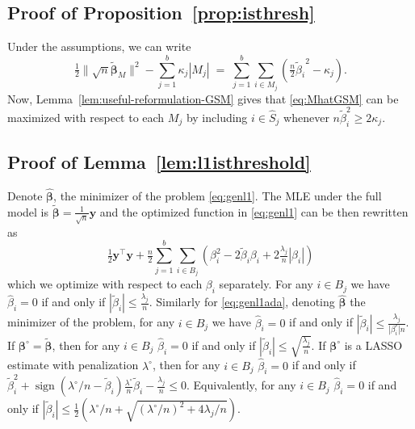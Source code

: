 \documentclass[aos]{imsart}
\theoremstyle{plain}
\newcommand{\bs}{\boldsymbol}
\begin{document}
\begin{supplement}
\subsection{Proof of Proposition~\ref{prop:isthresh}}
	Under the assumptions, we can write 
	$$
	\tfrac{1}{2}\|\sqrt{n}\tilde{\bs \beta}_M\|^2-\sum_{j=1}^b\kappa_j |M_j|\;=\;\sum_{j=1}^b\sum_{i\in M_j}(\tfrac{n}{2}{\tilde{ \beta}_i}^2-\kappa_j).
	$$
	Now, Lemma~\ref{lem:useful-reformulation-GSM} gives that \eqref{eq:MhatGSM} can be maximized with respect to each $M_j$ by including $i\in \hat S_j$ whenever $n\tilde\beta_i^2\geq 2\kappa_j$.

\subsection{Proof of Lemma~\ref{lem:l1isthreshold}}
    Denote $\hat{\bs \beta}$, the minimizer of the problem \eqref{eq:genl1}. The MLE under the full model is $\tilde{\bs\beta}=\tfrac{1}{\sqrt{n}} \bs y$ and the optimized function in \eqref{eq:genl1} can be then rewritten as
	$$
	\tfrac{1}{2}\bs y^{\top}\bs y +\tfrac{n}{2}\sum_{j=1}^b\sum_{i\in B_j}\left(\beta_i^2-2\tilde\beta_i\beta_i+2\tfrac{\lambda_j}{n}|\beta_i|\right)
	$$
	which we optimize with respect to each $\beta_i$ separately. For any $i\in B_j$ we have $\hat\beta_i=0$ if and only if $|\tilde \beta_i|\leq \frac{\lambda_j}{n}$. Similarly  for \eqref{eq:genl1ada}, denoting $\hat{\bs \beta}$ the minimizer of the problem, for any $i\in B_j$ we have $\hat\beta_i=0$ if and only if $|\tilde \beta_i|\leq \frac{\lambda_j}{|\beta^{\circ}_i|n}$. If $\bs \beta^{\circ}= \tilde{\bs\beta}$, then for any $i\in B_j$ $\hat{\beta}_i = 0$ if and only if $|\tilde \beta_i|\leq \sqrt{\tfrac{\lambda_j}{n}}$. If $\bs\beta^\circ$ is a LASSO estimate with penalization $\lambda^\circ$, then for any $i\in B_j$ 
 $\hat{\beta}_i = 0$ if and only if $\tilde{\beta}^2_i + \operatorname{sign}(\lambda^{\circ}/n-\tilde{\beta}_i) \frac{\lambda^\circ}{n}\tilde{\beta}_i-\frac{\lambda_j}{n} \leq 0$. Equivalently, for any $i\in B_j$ 
 $\hat{\beta}_i = 0$ if and only if $|\tilde{\beta}_ i| \leq  \frac{1}{2}\left(\lambda^\circ/n+\sqrt{(\lambda^\circ/n)^2+4 \lambda_j/n}\right)$.



\end{supplement}
\end{document}
